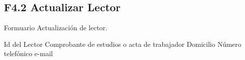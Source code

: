 


\subsection{F4.2 Actualizar Lector }
  Formuario Actualización de lector.\\

	\begin{UClist}
      \UCli Id del Lector
      \UCli Comprobante de estudios o acta de trabajador
      \UCli Domicilio
      \UCli Número telefónico
      \UCli e-mail
    \end{UClist}





